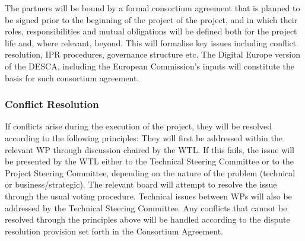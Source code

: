 \documentclass[a4paper,11pt]{article}
\begin{document}

The partners will be bound by a formal consortium agreement that is
planned to be signed prior to the beginning of the project of the project,
and in which their roles, responsibilities and mutual obligations will be
defined both for the project life and, where relevant, beyond.  This will
formalise key issues including conflict resolution, IPR procedures, governance structure
etc.  %
The Digital Europe version of the DESCA, including the European Commission's
inputs will constitute the basis for such consortium agreement.

\subsubsection*{Conflict Resolution}
\label{conflict-resolution}
If conflicts arise during the execution of the project, they will be resolved according to the following principles:
% 
They will first be addressed within the relevant WP through discussion chaired by the WTL.
If this fails, the issue will be presented by the WTL either to the Technical Steering Committee
or to the Project Steering Committee, depending on the nature of the problem (technical or business/strategic).
The relevant board will attempt to resolve the issue through the usual voting procedure.
%
Technical issues between WPs will also be addressed by the Technical Steering Committee.
Any conflicts that cannot be resolved through the principles above will
be handled according to the dispute resolution provision set forth in the
Consortium Agreement.
\end{document}
